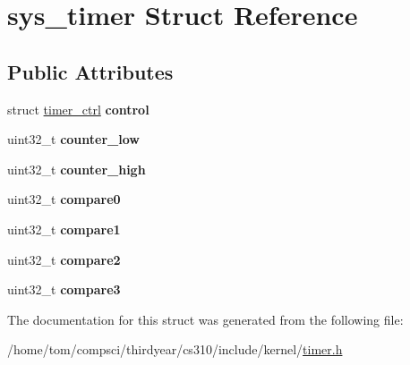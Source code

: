 \hypertarget{structsys__timer}{}\section{sys\+\_\+timer Struct Reference}
\label{structsys__timer}
\subsection*{Public Attributes}
\begin{DoxyCompactItemize}
\item 
\mbox{\label{structsys__timer_a6df0b7a397bb7c11500a6933114636a8}} 
struct \mbox{\hyperlink{structtimer__ctrl}{timer\+\_\+ctrl}} {\bfseries control}
\item 
\mbox{\label{structsys__timer_ab4cc6240b1ba3c0cfb3e030adc24effd}} 
uint32\+\_\+t {\bfseries counter\+\_\+low}
\item 
\mbox{\label{structsys__timer_a0c82be1032ae6784ed94d0a1588be467}} 
uint32\+\_\+t {\bfseries counter\+\_\+high}
\item 
\mbox{\label{structsys__timer_a84e782da2713b6f6b0036b04c2105da4}} 
uint32\+\_\+t {\bfseries compare0}
\item 
\mbox{\label{structsys__timer_aa02de04e0eec9d72cd707386560c48ed}} 
uint32\+\_\+t {\bfseries compare1}
\item 
\mbox{\label{structsys__timer_a1fbaef41141b4ec0d7d3dab501e78383}} 
uint32\+\_\+t {\bfseries compare2}
\item 
\mbox{\label{structsys__timer_ab669e8417e7959a73c4e3360c0e3ce12}} 
uint32\+\_\+t {\bfseries compare3}
\end{DoxyCompactItemize}


The documentation for this struct was generated from the following file\+:\begin{DoxyCompactItemize}
\item 
/home/tom/compsci/thirdyear/cs310/include/kernel/\mbox{\hyperlink{timer_8h}{timer.\+h}}\end{DoxyCompactItemize}
